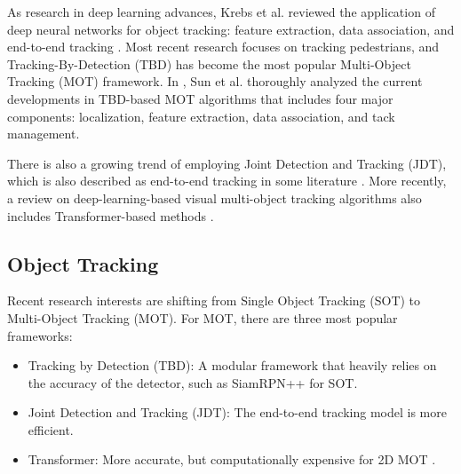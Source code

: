 As research in deep learning advances, Krebs et al. reviewed the application of deep neural networks for object tracking: feature extraction, data association, and end-to-end tracking \citep{krebs2017survey}. Most recent research focuses on tracking pedestrians, and Tracking-By-Detection (TBD) has become the most popular Multi-Object Tracking (MOT) framework. In \citep{sun2020survey}, Sun et al. thoroughly analyzed the current developments in TBD-based MOT algorithms that includes four major components: localization, feature extraction, data association, and tack management.

There is also a growing trend of employing Joint Detection and Tracking (JDT), which is also described as end-to-end tracking in some literature \citep{pal2021deep}. More recently, a review on deep-learning-based visual multi-object tracking algorithms also includes Transformer-based methods \citep{guo2022review}.





\subsection{Object Tracking}

Recent research interests are shifting from Single Object Tracking (SOT) to Multi-Object Tracking (MOT). For MOT, there are three most popular frameworks:

\begin{itemize}
    \item Tracking by Detection (TBD): A modular framework that heavily relies on the accuracy of the detector, such as SiamRPN++ \citep{li2019siamrpn++} for SOT.
    \item Joint Detection and Tracking (JDT): The end-to-end tracking model is more efficient.
    \item Transformer: More accurate, but computationally expensive \citep{meinhardt2022trackformer} for 2D MOT \citep{lin2021swintrack}.
\end{itemize}

